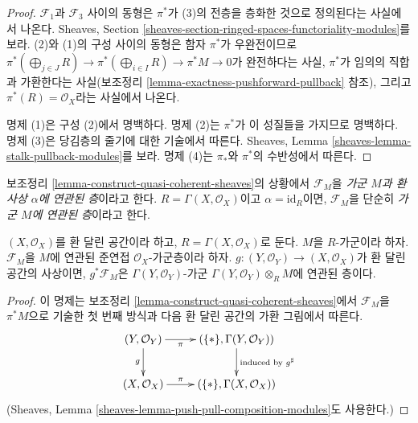 \begin{proof}
$\mathcal{F}_1$과 $\mathcal{F}_3$ 사이의 동형은 $\pi^*$가
(3)의 전층을 층화한 것으로 정의된다는 사실에서 나온다.
Sheaves, Section
\ref{sheaves-section-ringed-spaces-functoriality-modules}를 보라.
(2)와 (1)의 구성 사이의 동형은 함자 $\pi^*$가 우완전이므로
$\pi^*(\bigoplus_{j \in J} R) \to \pi^*(\bigoplus_{i \in I} R) \to
\pi^*M \to 0$가 완전하다는 사실, $\pi^*$가 임의의 직합과
가환한다는 사실(보조정리 \ref{lemma-exactness-pushforward-pullback} 참조),
그리고 $\pi^*(R) = \mathcal{O}_X$라는 사실에서 나온다.

\medskip\noindent
명제 (1)은 구성 (2)에서 명백하다.
명제 (2)는 $\pi^*$가 이 성질들을 가지므로 명백하다.
명제 (3)은 당김층의 줄기에 대한 기술에서 따른다.
Sheaves, Lemma \ref{sheaves-lemma-stalk-pullback-modules}를 보라.
명제 (4)는 $\pi_*$와 $\pi^*$의 수반성에서 따른다.
\end{proof}

\begin{definition}
\label{definition-sheaf-associated}
보조정리 \ref{lemma-construct-quasi-coherent-sheaves}의 상황에서
$\mathcal{F}_M$을 {\it 가군 $M$과 환 사상 $\alpha$에 연관된 층}이라고 한다.
$R = \Gamma(X, \mathcal{O}_X)$이고 $\alpha = \text{id}_R$이면,
$\mathcal{F}_M$을 단순히 {\it 가군 $M$에 연관된 층}이라고 한다.
\end{definition}


\begin{lemma}
\label{lemma-restrict-quasi-coherent}
$(X, \mathcal{O}_X)$를 환 달린 공간이라 하고,
$R = \Gamma(X, \mathcal{O}_X)$로 둔다.
$M$을 $R$-가군이라 하자.
$\mathcal{F}_M$을 $M$에 연관된 준연접 $\mathcal{O}_X$-가군층이라 하자.
$g : (Y, \mathcal{O}_Y) \to (X, \mathcal{O}_X)$가
환 달린 공간의 사상이면, $g^*\mathcal{F}_M$은
$\Gamma(Y, \mathcal{O}_Y)$-가군
$\Gamma(Y, \mathcal{O}_Y) \otimes_R M$에 연관된 층이다.
\end{lemma}

\begin{proof}
이 명제는 보조정리 \ref{lemma-construct-quasi-coherent-sheaves}에서
$\mathcal{F}_M$을 $\pi^*M$으로 기술한 첫 번째 방식과
다음 환 달린 공간의 가환 그림에서 따른다.
$$
\xymatrix{
(Y, \mathcal{O}_Y) \ar[r]_-\pi \ar[d]_g &
(\{*\}, \Gamma(Y, \mathcal{O}_Y)) \ar[d]^{\text{induced by }g^\sharp} \\
(X, \mathcal{O}_X) \ar[r]^-\pi &
(\{*\}, \Gamma(X, \mathcal{O}_X))
}
$$
(Sheaves, Lemma \ref{sheaves-lemma-push-pull-composition-modules}도 사용한다.)
\end{proof}

